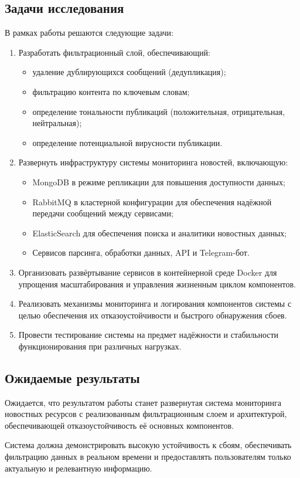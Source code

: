 \subsection{Задачи исследования}
В рамках работы решаются следующие задачи:
\begin{enumerate}
    \item Разработать фильтрационный слой, обеспечивающий:
    \begin{itemize}
        \item удаление дублирующихся сообщений (дедупликация);
        \item фильтрацию контента по ключевым словам;
        \item определение тональности публикаций (положительная, отрицательная, нейтральная);
        \item определение потенциальной вирусности публикации.
    \end{itemize}
    \item Развернуть инфраструктуру системы мониторинга новостей, включающую:
    \begin{itemize}
        \item MongoDB в режиме репликации для повышения доступности данных;
        \item RabbitMQ в кластерной конфигурации для обеспечения надёжной передачи сообщений между сервисами;
        \item ElasticSearch для обеспечения поиска и аналитики новостных данных;
        \item Сервисов парсинга, обработки данных, API и Telegram-бот.
    \end{itemize}
    \item Организовать развёртывание сервисов в контейнерной среде Docker для упрощения масштабирования и управления жизненным циклом компонентов.
    \item Реализовать механизмы мониторинга и логирования компонентов системы с целью обеспечения их отказоустойчивости и быстрого обнаружения сбоев.
    \item Провести тестирование системы на предмет надёжности и стабильности функционирования при различных нагрузках.
\end{enumerate}

\subsection{Ожидаемые результаты}
Ожидается, что результатом работы станет развернутая система мониторинга новостных ресурсов с реализованным фильтрационным слоем и архитектурой, обеспечивающей отказоустойчивость её основных компонентов.

Система должна демонстрировать высокую устойчивость к сбоям, обеспечивать фильтрацию данных в реальном времени и предоставлять пользователям только актуальную и релевантную информацию.
